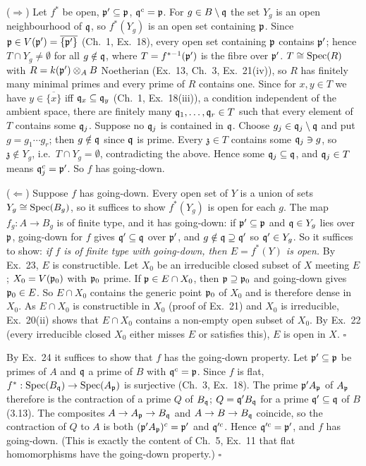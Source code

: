 \documentclass[11pt]{article}
\begin{document}
($\Rightarrow$) Let $f^*$ be open, $\mathfrak p'\subseteq\mathfrak p$, $\mathfrak q^c=\mathfrak p$. For $g\in B\setminus\mathfrak q$ the set $Y_g$ is an open neighbourhood of $\mathfrak q$, so $f^*(Y_g)$ is an open set containing $\mathfrak p$. Since $\mathfrak p\in V(\mathfrak p')=\overline{\{\mathfrak p'\}}$ (Ch.~1, Ex.~18), every open set containing $\mathfrak p$ contains $\mathfrak p'$; hence $T\cap Y_g\ne\emptyset$ for all $g\notin\mathfrak q$, where $T=f^{*-1}(\mathfrak p')$ is the fibre over $\mathfrak p'$. $T\cong\operatorname{Spec}(R)$ with $R=k(\mathfrak p')\otimes_AB$ Noetherian (Ex.~13, Ch.~3, Ex.~21(iv)), so $R$ has finitely many minimal primes and every prime of $R$ contains one. Since for $x,y\in T$ we have $y\in\overline{\{x\}}$ iff $\mathfrak q_x\subseteq\mathfrak q_y$ (Ch.~1, Ex.~18(iii)), a condition independent of the ambient space, there are finitely many $\mathfrak q_1,\dots,\mathfrak q_r\in T$ such that every element of $T$ contains some $\mathfrak q_j$. Suppose no $\mathfrak q_j$ is contained in $\mathfrak q$. Choose $g_j\in\mathfrak q_j\setminus\mathfrak q$ and put $g=g_1\cdots g_r$; then $g\notin\mathfrak q$ since $\mathfrak q$ is prime. Every $\mathfrak{z}\in T$ contains some $\mathfrak q_j\ni g$, so $\mathfrak{z}\notin Y_g$, i.e.\ $T\cap Y_g=\emptyset$, contradicting the above. Hence some $\mathfrak q_j\subseteq\mathfrak q$, and $\mathfrak q_j\in T$ means $\mathfrak q_j^c=\mathfrak p'$. So $f$ has going-down.

($\Leftarrow$) Suppose $f$ has going-down. Every open set of $Y$ is a union of sets $Y_g\cong\operatorname{Spec}(B_g)$, so it suffices to show $f^*(Y_g)$ is open for each $g$. The map $f_g:A\to B_g$ is of finite type, and it has going-down: if $\mathfrak p'\subseteq\mathfrak p$ and $\mathfrak q\in Y_g$ lies over $\mathfrak p$, going-down for $f$ gives $\mathfrak q'\subseteq\mathfrak q$ over $\mathfrak p'$, and $g\notin\mathfrak q\supseteq\mathfrak q'$ so $\mathfrak q'\in Y_g$. So it suffices to show: \emph{if $f$ is of finite type with going-down, then $E=f^*(Y)$ is open.} By Ex.~23, $E$ is constructible. Let $X_0$ be an irreducible closed subset of $X$ meeting $E$; $X_0=V(\mathfrak p_0)$ with $\mathfrak p_0$ prime. If $\mathfrak p\in E\cap X_0$, then $\mathfrak p\supseteq\mathfrak p_0$ and going-down gives $\mathfrak p_0\in E$. So $E\cap X_0$ contains the generic point $\mathfrak p_0$ of $X_0$ and is therefore dense in $X_0$. As $E\cap X_0$ is constructible in $X_0$ (proof of Ex.~21) and $X_0$ is irreducible, Ex.~20(ii) shows that $E\cap X_0$ contains a non-empty open subset of $X_0$. By Ex.~22 (every irreducible closed $X_0$ either misses $E$ or satisfies this), $E$ is open in $X$. \hfill$\square$

\pf
By Ex.~24 it suffices to show that $f$ has the going-down property. Let $\mathfrak p'\subseteq\mathfrak p$ be primes of $A$ and $\mathfrak q$ a prime of $B$ with $\mathfrak q^c=\mathfrak p$. Since $f$ is flat, $f^*:\operatorname{Spec}(B_\mathfrak q)\to\operatorname{Spec}(A_\mathfrak p)$ is surjective (Ch.~3, Ex.~18). The prime $\mathfrak p'A_\mathfrak p$ of $A_\mathfrak p$ therefore is the contraction of a prime $Q$ of $B_\mathfrak q$; $Q=\mathfrak q'B_\mathfrak q$ for a prime $\mathfrak q'\subseteq\mathfrak q$ of $B$ (3.13). The composites $A\to A_\mathfrak p\to B_\mathfrak q$ and $A\to B\to B_\mathfrak q$ coincide, so the contraction of $Q$ to $A$ is both $(\mathfrak p'A_\mathfrak p)^c=\mathfrak p'$ and $\mathfrak q'^c$. Hence $\mathfrak q'^c=\mathfrak p'$, and $f$ has going-down. (This is exactly the content of Ch.~5, Ex.~11 that flat homomorphisms have the going-down property.) \hfill$\square$
\end{document}
